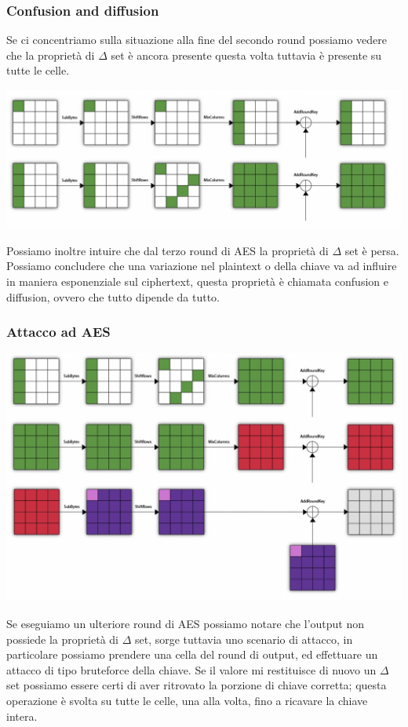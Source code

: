 \documentclass[11pt, oneside]{article}   	%
\begin{document}
\subsubsection*{Confusion and diffusion}
Se ci concentriamo sulla situazione alla fine del secondo round possiamo vedere che la proprietà di $\Delta$ set è ancora presente questa volta tuttavia è presente su tutte le celle.
\begin{center}
\includegraphics[scale= 0.4]{deltaset4}
\end{center}
Possiamo inoltre intuire che dal terzo round di AES la proprietà di $\Delta$ set è persa.\\
Possiamo concludere che una variazione nel plaintext o della chiave va ad influire in maniera esponenziale sul ciphertext, questa proprietà è chiamata confusion e diffusion, ovvero che tutto dipende da tutto.
\subsubsection*{Attacco ad AES}
\begin{center}
\includegraphics[scale= 0.4]{deltaset6}
\end{center}
Se eseguiamo un ulteriore round di AES possiamo notare che l'output non possiede la proprietà di $\Delta$ set, sorge tuttavia uno scenario di attacco, in particolare possiamo prendere una cella del round di output, ed effettuare un attacco di tipo bruteforce della chiave. Se il valore mi restituisce di nuovo un $\Delta$ set possiamo essere certi di aver ritrovato la porzione di chiave corretta; questa operazione è svolta su tutte le celle, una alla volta, fino a ricavare la chiave intera.
\end{document}
